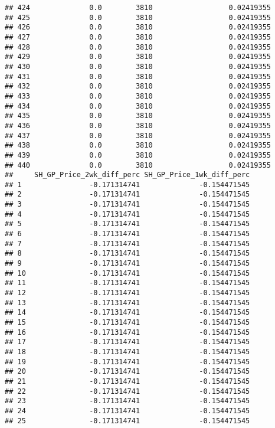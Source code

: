 \documentclass[]{article}
\begin{document}
\begin{verbatim}
## 424              0.0        3810                  0.02419355
## 425              0.0        3810                  0.02419355
## 426              0.0        3810                  0.02419355
## 427              0.0        3810                  0.02419355
## 428              0.0        3810                  0.02419355
## 429              0.0        3810                  0.02419355
## 430              0.0        3810                  0.02419355
## 431              0.0        3810                  0.02419355
## 432              0.0        3810                  0.02419355
## 433              0.0        3810                  0.02419355
## 434              0.0        3810                  0.02419355
## 435              0.0        3810                  0.02419355
## 436              0.0        3810                  0.02419355
## 437              0.0        3810                  0.02419355
## 438              0.0        3810                  0.02419355
## 439              0.0        3810                  0.02419355
## 440              0.0        3810                  0.02419355
##     SH_GP_Price_2wk_diff_perc SH_GP_Price_1wk_diff_perc
## 1                -0.171314741              -0.154471545
## 2                -0.171314741              -0.154471545
## 3                -0.171314741              -0.154471545
## 4                -0.171314741              -0.154471545
## 5                -0.171314741              -0.154471545
## 6                -0.171314741              -0.154471545
## 7                -0.171314741              -0.154471545
## 8                -0.171314741              -0.154471545
## 9                -0.171314741              -0.154471545
## 10               -0.171314741              -0.154471545
## 11               -0.171314741              -0.154471545
## 12               -0.171314741              -0.154471545
## 13               -0.171314741              -0.154471545
## 14               -0.171314741              -0.154471545
## 15               -0.171314741              -0.154471545
## 16               -0.171314741              -0.154471545
## 17               -0.171314741              -0.154471545
## 18               -0.171314741              -0.154471545
## 19               -0.171314741              -0.154471545
## 20               -0.171314741              -0.154471545
## 21               -0.171314741              -0.154471545
## 22               -0.171314741              -0.154471545
## 23               -0.171314741              -0.154471545
## 24               -0.171314741              -0.154471545
## 25               -0.171314741              -0.154471545

\end{verbatim}
\end{document}
